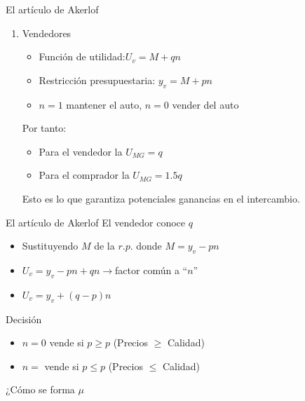 \begin{frame}{El artículo de Akerlof}
	\begin{enumerate}[2]
		\item Vendedores
			\begin{itemize}
				\item Función de utilidad:$U_v = M +qn$
				\item Restricción presupuestaria: $y_v = M + pn$
				\item $n=1$ mantener el auto, $n=0$ vender del auto
			\end{itemize}
		Por tanto:
			\begin{itemize}
				\item Para el vendedor la $U_{MG} = q$
				\item Para el comprador la $U_{MG} = 1.5q$
			\end{itemize}
		Esto es lo que garantiza potenciales ganancias en el intercambio.
	\end{enumerate}
\end{frame}
\begin{frame}{El artículo de Akerlof}
	El vendedor conoce $q$
		\begin{itemize}
			\item Sustituyendo $M$ de la $r.p.$ donde $M=y_v - pn$
			\item $U_v = y_v - pn +qn \longrightarrow $factor común a ``$n$''
			\item $U_v = y_v + (q-p)n$
		\end{itemize}
	Decisión
		\begin{itemize}
			\item $n = 0$ vende si $p\geq p$ (Precios $\geq$ Calidad)
			\item $n = $ vende si $p\leq p$ (Precios $\leq$ Calidad)
		\end{itemize}
	¿Cómo se forma $\mu$
\end{frame}
